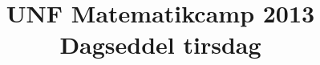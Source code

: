 \documentclass[article,10pt,oneside]{article}
\begin{document}
\title{UNF Matematikcamp 2013 \\ Dagseddel tirsdag}

\begin{minipage}[t]{410mm}
\begin{minipage}[t]{200mm}

\end{minipage}%
\hspace{10mm}\begin{minipage}[t]{200mm}

\end{minipage}
\end{minipage}

\newpage

\begin{minipage}[t]{410mm}

\end{minipage}
\end{document}
